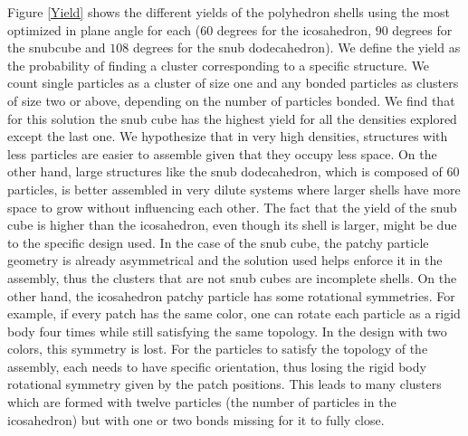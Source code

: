 \documentclass[a4paper, amsfonts, amssymb, amsmath, reprint, showkeys, nofootinbib, twoside]{revtex4-1}
\begin{document}
Figure \ref{Yield} shows the different yields of the polyhedron shells using the most optimized in plane angle for each ($60$ degrees for the icosahedron, $90$ degrees for the snubcube and $108$ degrees for the snub dodecahedron). We define the yield as the probability of finding a cluster corresponding to a specific structure. We count single particles as a cluster of size one and any bonded particles as clusters of size two or above, depending on the number of particles bonded. We find that for this solution the snub cube has the highest yield for all the densities explored except the last one.  We hypothesize that in very high densities, structures with less particles are easier to assemble given that they occupy less space. On the other hand, large structures like the snub dodecahedron, which is composed of $60$ particles, is better assembled in very dilute systems where larger shells have more space to grow without influencing each other. The fact that the yield of the snub cube is higher than the icosahedron, even though its shell is larger, might be due to the specific design used. In the case of the snub cube, the patchy particle geometry is already asymmetrical and the solution used helps enforce it in the assembly, thus the clusters that are not snub cubes are incomplete shells. On the other hand, the icosahedron patchy particle has some rotational symmetries. For example, if every patch has the same color, one can rotate each particle as a rigid body four times while still satisfying the same topology. In the design with two colors, this symmetry is lost. For the particles to satisfy the topology of the assembly, each needs to have specific orientation, thus losing the rigid body rotational symmetry given by the patch positions. This leads to many clusters which are formed with twelve particles (the number of particles in the icosahedron) but with one or two bonds missing for it to fully close.
\end{document}
